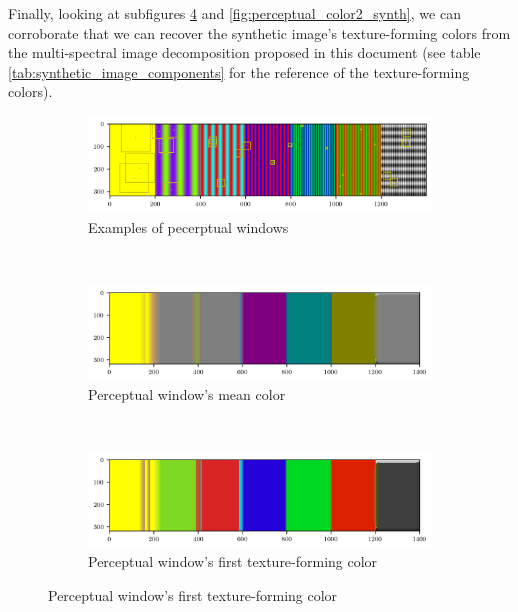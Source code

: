 \documentclass[journal]{IEEEtran}
\begin{document}
Finally, looking at subfigures \ref{fig:perceptual_color1_synth} and \ref{fig:perceptual_color2_synth}, we can corroborate that we can recover the synthetic image's texture-forming colors from the multi-spectral image decomposition proposed in this document (see table \ref{tab:synthetic_image_components} for the reference of the texture-forming colors).

\begin{figure}[!ht]
    \centering
    \begin{subfigure}[b]{0.5\textwidth}
    	\includegraphics[width=\textwidth]{perceptual_windows_synth_25}
        \caption{Examples of pecerptual windows}
        \label{fig:perceptual_windows_synth_25}
    \end{subfigure}\\
    \begin{subfigure}[b]{0.5\textwidth}
    	\includegraphics[width=\textwidth]{perceptual_mean_color_synth}
        \caption{Perceptual window's mean color}
        \label{fig:perceptual_mean_color_synth}
    \end{subfigure}\\
    \begin{subfigure}[b]{0.5\textwidth}
    	\includegraphics[width=\textwidth]{perceptual_color1_synth}
        \caption{Perceptual window's first texture-forming color}
        \label{fig:perceptual_color1_synth}

\end{subfigure}
\end{figure}
\end{document}
